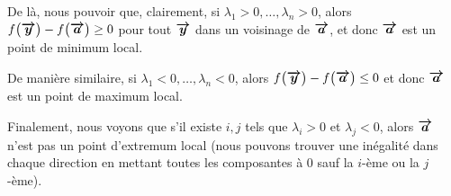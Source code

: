 \documentclass[a4paper]{article}
\begin{document}
{{        De là, nous pouvoir que, clairement, si $\lambda_1 > 0, \ldots, \lambda_n > 0$, alors $f\left(\bvec{y}\right) - f\left(\bvec{a}\right) \geq 0$ pour tout $\bm{\protect\overrightarrow{y}}$ dans un voisinage de $\bm{\protect\overrightarrow{a}}$, et donc $\bm{\protect\overrightarrow{a}}$ est un point de minimum local. 

        De manière similaire, si $\lambda_1 < 0, \ldots, \lambda_n < 0$, alors $f\left(\bvec{y}\right) - f\left(\bvec{a}\right) \leq 0$ et donc $\bm{\protect\overrightarrow{a}}$ est un point de maximum local.

        Finalement, nous voyons que s'il existe $i, j$ tels que $\lambda_i > 0$ et $\lambda_j < 0$, alors $\bm{\protect\overrightarrow{a}}$ n'est pas un point d'extremum local (nous pouvons trouver une inégalité dans chaque direction en mettant toutes les composantes à 0 sauf la $i$-ème ou la $j$-ème).
    }
}
\end{document}
